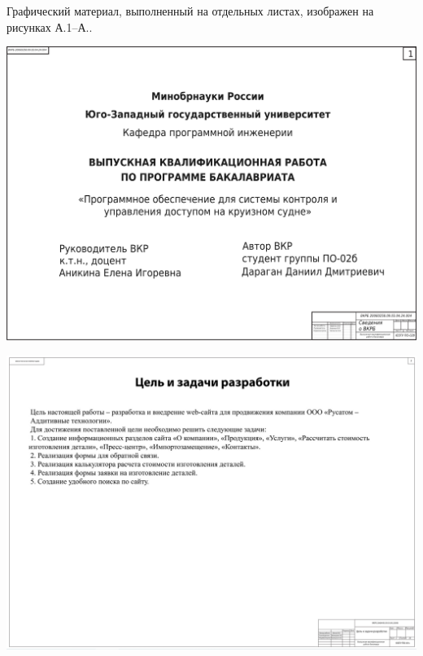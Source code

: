 
Графический материал, выполненный на отдельных листах,
изображен на рисунках А.1--А..
\setcounter{числоПлакатов}{0}

\renewcommand{\thefigure}{А.\arabic{figure}} %

\begin{landscape}
	
\begin{плакат}
	\includegraphics[width=0.82\linewidth]{images/плакат1.png}
	\label{fig:1}
\end{плакат}

\begin{плакат}
	\includegraphics[width=0.82\linewidth]{images/плакат2}
	\label{fig:2}
\end{плакат}


\end{landscape}
